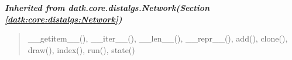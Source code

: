 \large{\textbf{\textit{Inherited from datk.core.distalgs.Network\textit{(Section \ref{datk:core:distalgs:Network})}}}}

\begin{quote}
\_\_getitem\_\_(), \_\_iter\_\_(), \_\_len\_\_(), \_\_repr\_\_(), add(), clone(), draw(), index(), run(), state()
\end{quote}
